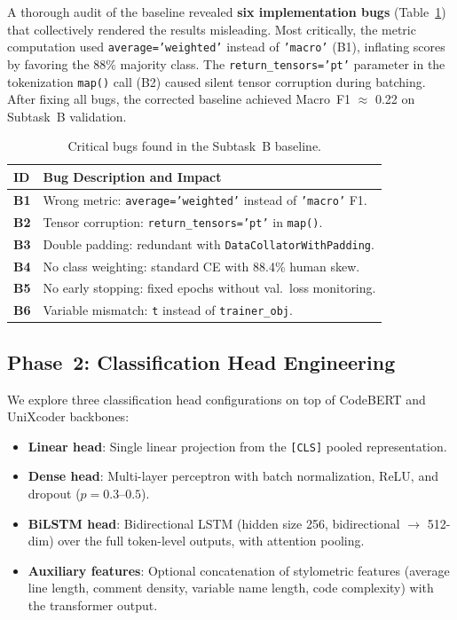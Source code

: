 \documentclass[11pt]{article}
\begin{document}
A thorough audit of the baseline revealed \textbf{six implementation bugs} (Table~\ref{tab:taskB_bugs}) that collectively rendered the results misleading. Most critically, the metric computation used \texttt{average='weighted'} instead of \texttt{'macro'} (B1), inflating scores by favoring the 88\% majority class. The \texttt{return\_tensors='pt'} parameter in the tokenization \texttt{map()} call (B2) caused silent tensor corruption during batching. After fixing all bugs, the corrected baseline achieved Macro~F1 $\approx$ 0.22 on Subtask~B validation.

\begin{table}[ht]
\centering
\footnotesize
\begin{tabularx}{\columnwidth}{@{}l X@{}}
\toprule
\textbf{ID} & \textbf{Bug Description and Impact} \\ \midrule
\textbf{B1} & Wrong metric: \texttt{average='weighted'} instead of \texttt{'macro'} F1. \\
\textbf{B2} & Tensor corruption: \texttt{return\_tensors='pt'} in \texttt{map()}. \\
\textbf{B3} & Double padding: redundant with \texttt{DataCollatorWithPadding}. \\
\textbf{B4} & No class weighting: standard CE with 88.4\% human skew. \\
\textbf{B5} & No early stopping: fixed epochs without val.\ loss monitoring. \\
\textbf{B6} & Variable mismatch: \texttt{t} instead of \texttt{trainer\_obj}. \\
\bottomrule
\end{tabularx}
\caption{Critical bugs found in the Subtask~B baseline.}
\label{tab:taskB_bugs}
\end{table}

\subsection{Phase~2: Classification Head Engineering}
\label{sec:heads}

We explore three classification head configurations on top of CodeBERT and UniXcoder backbones:
\begin{itemize}
    \item \textbf{Linear head}: Single linear projection from the \texttt{[CLS]} pooled representation.
    \item \textbf{Dense head}: Multi-layer perceptron with batch normalization, ReLU, and dropout ($p{=}0.3$--$0.5$).
    \item \textbf{BiLSTM head}: Bidirectional LSTM (hidden size 256, bidirectional $\to$ 512-dim) over the full token-level outputs, with attention pooling.
    \item \textbf{Auxiliary features}: Optional concatenation of stylometric features (average line length, comment density, variable name length, code complexity) with the transformer output.
\end{itemize}
\end{document}
